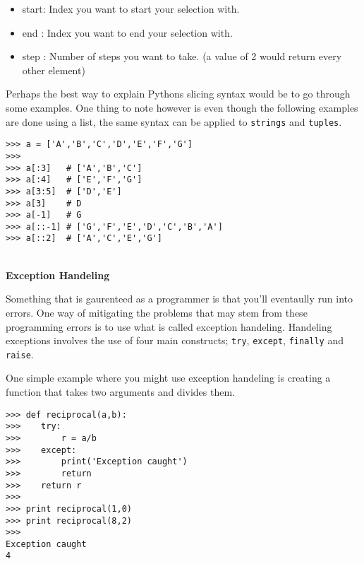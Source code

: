 \documentclass[letterpaper,11pt]{article}
\begin{document}
\begin{itemize}
    \setlength\itemsep{1pt}
    \item start: Index you want to start your selection with.
    \item end  : Index you want to end your selection with.
    \item step : Number of steps you want to take. (a value of 2 would return
        every other element)
\end{itemize}
\par{Perhaps the best way to explain Pythons slicing syntax would be to go
through some examples. One thing to note however is even though the following
examples are done using a list, the same syntax can be applied to
\texttt{strings} and \texttt{tuples}.}
\\
\begin{minipage}{.75\textwidth}
    \begin{tcolorbox}
        \begin{footnotesize}
            \begin{verbatim}
>>> a = ['A','B','C','D','E','F','G']
>>>
>>> a[:3]   # ['A','B','C']
>>> a[:4]   # ['E','F','G']
>>> a[3:5]  # ['D','E']
>>> a[3]    # D
>>> a[-1]   # G
>>> a[::-1] # ['G','F','E','D','C','B','A']
>>> a[::2]  # ['A','C','E','G']
            \end{verbatim}
        \end{footnotesize}
    \end{tcolorbox}
\end{minipage}
\\
\textbf{Exception Handeling}
\par{Something that is gaurenteed as a programmer is that you'll eventaully run
into errors. One way of mitigating the problems that may stem from these
programming errors is to use what is called exception handeling. Handeling
exceptions involves the use of four main constructs; \texttt{try},
\texttt{except}, \texttt{finally} and \texttt{raise}.} 
\par{One simple example where you might use exception handeling is creating a
function that takes two arguments and divides them.}
\\
\begin{minipage}{.75\textwidth}
    \begin{tcolorbox}
        \begin{footnotesize}
            \begin{verbatim}
>>> def reciprocal(a,b):
>>>    try:
>>>        r = a/b
>>>    except:
>>>        print('Exception caught')
>>>        return
>>>    return r
>>>
>>> print reciprocal(1,0)
>>> print reciprocal(8,2)
>>>
Exception caught
4
            \end{verbatim}
        \end{footnotesize}
    \end{tcolorbox}
\end{minipage}
\end{document}
